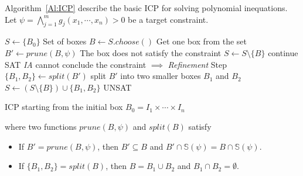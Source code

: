 \documentclass[runningheads,a4paper,oribibl]{llncs}
\begin{document}




Algorithm~\ref{Al:ICP} describe the basic ICP for solving polynomial inequations.
Let $\psi = \bigwedge\limits_{j=1}^mg_j(x_1, \cdots, x_n) > 0$ be a target constraint. 
\begin{algorithm}
\begin{algorithmic}[1]
\State $S \gets \{B_0\}$ \Comment Set of boxes
  \State $B \gets S.choose()$ \Comment Get one box from the set
  \State $B' \gets prune(B, \psi)$
   \Comment The box does not satisfy the constraint
  	\State $S \gets S \setminus \{B\}$
  	\State continue
  	\State \Return SAT
  \Else \Comment \emph{IA} cannot conclude the constraint $\implies$ \emph{Refinement} Step
  	\State $\{B_1, B_2\} \gets split(B')$ \Comment split $B'$ into two smaller boxes $B_1$ and $B_2$	
  	\State $S \gets (S \setminus \{B\}) \cup \{B_1, B_2\}$
  \EndIf
\EndWhile
\State \Return UNSAT
\end{algorithmic}
\caption{ICP starting from the initial box $B_0 = I_1 \times \cdots \times I_n$}
\label{Al:ICP}
\end{algorithm}

\noindent
where two functions $prune(B,\psi)$ and $split(B)$ satisfy 
\begin{itemize}
\item If $B' = prune (B, \psi)$,
  then $B' \subseteq B $ and $ B' \cap \mathbb{S}(\psi) = B \cap \mathbb{S}(\psi)$. 
\item If $\{B_1, B_2\} = split (B)$,
  then $B = B_1 \cup B_2$ and $B_1 \cap B_2 = \emptyset$. 
\end{itemize}
\end{document}
